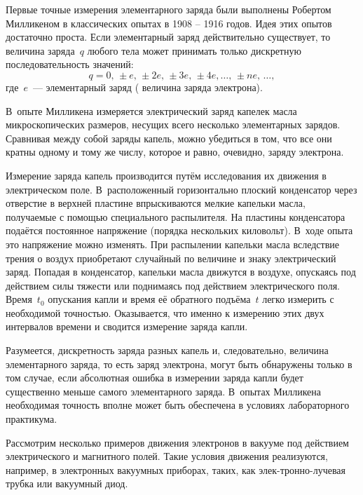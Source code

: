 Первые точные измерения элементарного заряда были выполнены Робертом Милликеном
в классических опытах в 1908 -- 1916 годов. Идея этих опытов достаточно проста.
Если элементарный заряд действительно существует, то величина заряда~$q$ любого
тела может принимать только дискретную последовательность значений:
\begin{equation*}
	q = 0,\,\pm e,\,\pm2e,\,\pm3e,\,\pm4e, \ldots,\, \pm ne,\, \ldots,
\end{equation*}
где~$e$~--- элементарный заряд ( величина заряда
электрона).

В~опыте Милликена измеряется электрический заряд капелек масла микроскопических
размеров, несущих всего несколько
элементарных зарядов. Сравнивая между собой заряды капель, можно убедиться в
том, что все они кратны одному и тому же числу, которое и равно, очевидно,
заряду электрона.

Измерение заряда капель производится путём исследования их движения в
электрическом поле. В~расположенный горизонтально плоский конденсатор через
отверстие в верхней пластине впрыскиваются мелкие капельки масла, получаемые с
помощью специального распылителя. На пластины конденсатора подаётся постоянное
напряжение (порядка нескольких киловольт). В~ходе опыта это напряжение можно
изменять. При распылении капельки масла вследствие трения о воздух приобретают
случайный по величине и знаку электрический заряд. Попадая в конденсатор,
капельки масла движутся в воздухе, опускаясь под действием силы тяжести или
поднимаясь под действием электрического поля. Время~$t_0$ опускания капли и
время её обратного подъёма~$t$ легко измерить с необходимой точностью.
Оказывается, что именно к измерению этих двух интервалов времени и сводится
измерение заряда капли.

Разумеется, дискретность заряда разных капель и, следовательно, величина
элементарного заряда, то есть заряд электрона, могут быть обнаружены только в
том случае, если абсолютная ошибка в измерении заряда капли будет существенно
меньше самого элементарного заряда. В~опытах Милликена необходимая точность
вполне может быть обеспечена в условиях лабораторного практикума.


Рассмотрим несколько примеров движения электронов в вакууме под действием
электрического и магнитного полей. Такие
условия движения реализуются, например, в электронных вакуумных приборах, таких,
как элек-тронно-лучевая трубка или
вакуумный диод.

